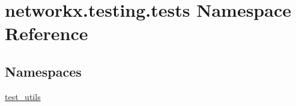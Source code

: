\hypertarget{namespacenetworkx_1_1testing_1_1tests}{}\section{networkx.\+testing.\+tests Namespace Reference}
\label{namespacenetworkx_1_1testing_1_1tests}
\subsection*{Namespaces}
\begin{DoxyCompactItemize}
\item 
 \hyperlink{namespacenetworkx_1_1testing_1_1tests_1_1test__utils}{test\+\_\+utils}
\end{DoxyCompactItemize}
